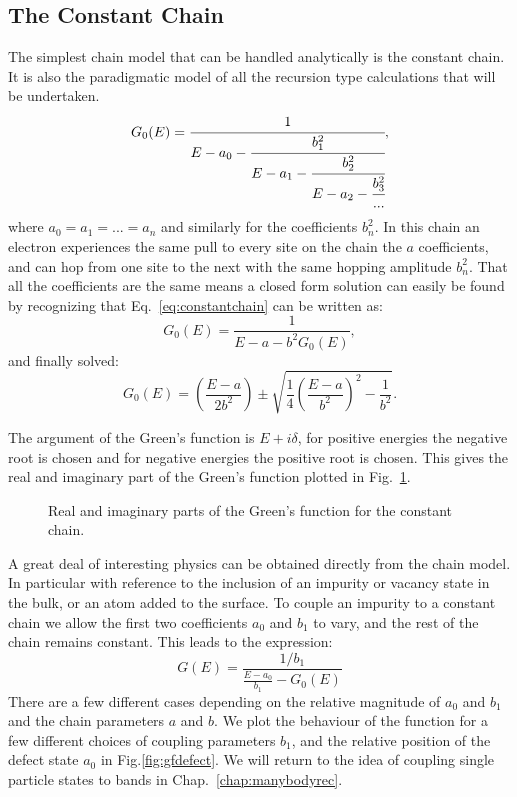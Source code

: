 \subsection{The Constant Chain}
The simplest chain model that can be handled analytically is the constant chain. It is 
also the paradigmatic model of all the recursion type calculations that will be undertaken.
%
\begin{equation}
\label{eq:constantchain}
G_{0}(E) = \cfrac{1}{E-a_{0}-\cfrac{b_{1}^2}{E-a_{1}-\cfrac{b_{2}^{2}}{E-a_{2}-\cfrac{b_{3}^{2}}{...}}}},
\end{equation}
%
where $a_{0}=a_{1}=...=a_{n}$ and similarly for the coefficients $b_{n}^{2}$. In this chain an electron
experiences the same pull to every site on the chain the $a$ coefficients, and can hop from one site to 
the next with the same hopping amplitude $b^{2}_{n}$. That all the coefficients are the same means a closed form solution
can easily be found by recognizing that Eq.~\ref{eq:constantchain} can be written as:
\begin{equation}
G_{0}(E) = \frac{1}{E-a-b^{2}G_{0}(E)},
\end{equation}
and finally solved:
\begin{equation}
G_{0}(E) = (\frac{E-a}{2b^{2}}) \pm \sqrt{\frac{1}{4}(\frac{E-a}{b^{2}})^{2} - \frac{1}{b^{2}}}.
\end{equation}

The argument of the Green's function is $E + i\delta$, for positive energies the negative root is chosen
and for negative energies the positive root is chosen. This gives the real
and imaginary part of the Green's function plotted in Fig.~\ref{fig:gfconstchain}.
%
\begin{figure}
\begin{center}
{\graphicspath{{./invariance/chain_figs/}}}
\caption{Real and imaginary parts of the Green's function for the constant chain.\label{fig:gfconstchain}}
\end{center}
\end{figure}
%
A great deal of interesting physics can be obtained directly from the chain model. In particular with reference 
to the inclusion of an impurity or vacancy state in the bulk, or an atom added to the surface. To couple 
an impurity to a constant chain we allow the first two coefficients $a_{0}$ and $b_{1}$ to vary, 
and the rest of the chain remains constant. This leads to the expression:
%
\begin{equation}
G(E) = \frac{1/b_{1}}{\frac{E-a_{0}}{b_{1}} - G_{0}(E)}
\end{equation}
%
There are a few different cases depending on the relative magnitude of $a_0$ 
and $b_{1}$ and the chain parameters $a$ and $b$.
We plot the behaviour of the function for a few different choices of coupling parameters
$b_{1}$, and the relative position of the defect state $a_0$ in Fig.\ref{fig:gfdefect}. 
We will return to the idea of coupling single particle states to bands in Chap.~\ref{chap:manybodyrec}. 

